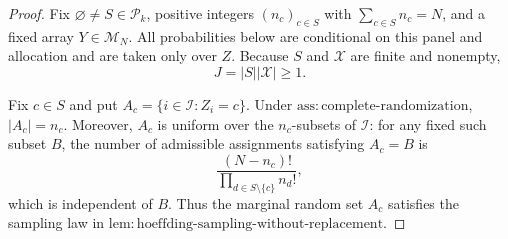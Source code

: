 \documentclass{article}
\begin{document}
\begin{proof}
Fix \(\varnothing\neq S\in\mathcal P_k\), positive integers \((n_c)_{c\in S}\) with \(\sum_{c\in S}n_c=N\), and a fixed array \(Y\in\mathcal M_N\).  All probabilities below are conditional on this panel and allocation and are taken only over \(Z\).  Because \(S\) and \(\mathcal X\) are finite and nonempty,
\[
J=|S||\mathcal X|\geq 1.
\]

Fix \(c\in S\) and put \(A_c=\{i\in\mathcal I:Z_i=c\}\).  Under \(\mathrm{ass{:}complete\text{-}randomization}\), \(|A_c|=n_c\).  Moreover, \(A_c\) is uniform over the \(n_c\)-subsets of \(\mathcal I\): for any fixed such subset \(B\), the number of admissible assignments satisfying \(A_c=B\) is
\[
\frac{(N-n_c)!}{\prod_{d\in S\setminus\{c\}}n_d!},
\]
which is independent of \(B\).  Thus the marginal random set \(A_c\) satisfies the sampling law in \(\mathrm{lem{:}hoeffding\text{-}sampling\text{-}without\text{-}replacement}\).


\end{proof}
\end{document}
